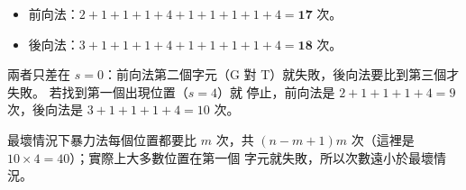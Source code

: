 \begin{pastsoln}
\begin{itemize}
\item 前向法：$2 + 1 + 1 + 1 + 4 + 1 + 1 + 1 + 1 + 4 = \mathbf{17}$ 次。
\item 後向法：$3 + 1 + 1 + 1 + 4 + 1 + 1 + 1 + 1 + 4 = \mathbf{18}$ 次。
\end{itemize}
兩者只差在 $s = 0$：前向法第二個字元（G 對 T）就失敗，後向法要比到第三個才失敗。 若找到第一個出現位置（$s = 4$）就
停止，前向法是 $2 + 1 + 1 + 1 + 4 = 9$ 次，後向法是 $3 + 1 + 1 + 1 + 4 = 10$ 次。

最壞情況下暴力法每個位置都要比 $m$ 次，共 $(n - m + 1)m$ 次（這裡是 $10 \times 4 = 40$）；實際上大多數位置在第一個
字元就失敗，所以次數遠小於最壞情況。
\end{pastsoln}
